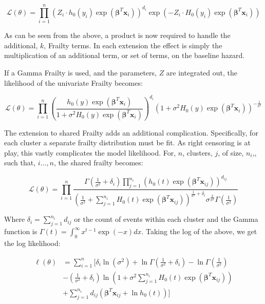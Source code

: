 $$ \mathcal {L}(\theta) = \prod^n_{i=1} \left (Z_i \cdot h_0(y_i) \exp(\boldsymbol\beta^T \textbf{x}_i)  \right )^{d_i} \exp(-Z_i \cdot H_0(y_i) \exp(\boldsymbol\beta^T \textbf{x}_i)) $$

As can be seen from the above, a product is now required to handle the additional, $k$, Frailty terms. In each extension the effect is simply the multiplication of an additional term, or set of terms, on the baseline hazard.

If a Gamma Frailty is used, and the parameters, $Z$ are integrated out, the likelihood of the univariate Frailty becomes: 

$$ \mathcal {L}(\theta) = \prod_{i=1}^n \left (\frac{h_0(y) \exp(\boldsymbol\beta^T \textbf{x}_i)}{1+ \sigma^2 H_0(y) \exp(\boldsymbol\beta^T \textbf{x}_i)}  \right )^{d_i} (1+ \sigma^2 H_0(y) \exp(\boldsymbol\beta^T \textbf{x}_i))^{-\frac{1}{\sigma^2}} $$

The extension to shared Frailty adds an additional complication. Specifically, for each cluster a separate frailty distribution must be fit. As right censoring is at play, this vastly complicates the model likelihood. For, $n$, clusters, $j$, of size, $n_i$,, such that, $i \dots, n$, the shared frailty becomes\cite{Wienke2010}:

$$ \mathcal {L}(\theta) =\prod_{i=1}^n \frac{\Gamma(\frac{1}{\sigma^2} + \delta_i) \prod^{n_i}_{j=1} (h_0(t) \exp(\boldsymbol\beta^T \textbf{x}_{ij}))^{d_{ij}} }{(\frac{1}{\sigma^2} + \sum_{j =1}^{n_i} H_0(t) \exp(\boldsymbol\beta^T \textbf{x}_{ij}))^{\frac{1}{\sigma^2} + \delta_i} \sigma^{\frac{2}{\sigma^2}} \Gamma(\frac{1}{\sigma^2})} $$

Where $\delta_i = \sum^{n_i}_{j=1} d_{ij}$ or the count of events within each cluster and the Gamma function is $\Gamma (t) = \int _{0}^{\infty }x^{t-1}\exp(-x)dx$. Taking the log of the above, we get the log likelihood\cite{Duchateau2008}:

\begin{align*}
\ell(\theta)& = \sum^n_{i=1}  \Bigg[\delta_i \ln(\sigma^2) + \ln \Gamma\left (\frac{1}{\sigma^2} + \delta_i  \right )  - \ln\Gamma\left (\frac{1}{\sigma^2}  \right )\\
& - \left (\frac{1}{\sigma^2} + \delta_i  \right ) \ln \left (1 + \sigma^2 \sum_{j=1}^{n_i} H_0(t)\exp(\boldsymbol\beta^T \textbf{x}_{ij})  \right )\\
& + \sum_{j=1}^{n_i} d_{ij} \left (\boldsymbol\beta^T \textbf{x}_{ij} + \ln h_0(t) \right )  \Bigg]
\end{align*}

